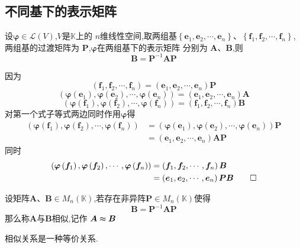 \subsection{不同基下的表示矩阵}
\begin{formal}
\begin{theorem}[不同基下的表示矩阵]\label{thm:不同基下的表示矩阵}
    设$\bm{\varphi}\in \mathcal{L}\left(
        V
    \right)$,$V$是$\mathbb{K}$上的
    $n$维线性空间,取两组基$\left\{
        \bm{e}_1,\bm{e}_2,\cdots,\bm{e}_n
    \right\}$、$
    \left\{
        \bm{f}_1,\bm{f}_2,\cdots,\bm{f}_n
    \right\}$,
    两组基的过渡矩阵为
    $\bm{P}$,$\bm{\varphi}$在两组基下的表示矩阵
    分别为
    $\bm{A}$、$\bm{B}$,则
    \[
    \bm{B}=\bm{P}^{-1}\bm{AP}
    \]
\end{theorem}
\begin{Proof}
因为
\[
\left(\bm{f}_1,\bm{f}_2,\cdots,\bm{f}_n\right)
=\left(\bm{e}_1,\bm{e}_2,\cdots,\bm{e}_n\right)
\bm{P}
\]
\[
\left(
    \bm{\varphi}\left(\bm{e}_1\right),
    \bm{\varphi}\left(\bm{e}_2\right),\cdots,
    \bm{\varphi}\left(\bm{e}_n\right)
\right)=
\left(\bm{e}_1,\bm{e}_2,\cdots,\bm{e}_n\right)\bm{A}
\]
\[
\left(
    \bm{\varphi}\left(\bm{f}_1\right),
    \bm{\varphi}\left(\bm{f}_2\right),\cdots,
    \bm{\varphi}\left(\bm{f}_n\right)
\right)=
\left(\bm{f}_1,\bm{f}_2,\cdots,\bm{f}_n\right)\bm{B}
\]
对第一个式子等式两边同时作用$\bm{\varphi}$得
\begin{align*}
   \left(
    \bm{\varphi}\left(\bm{f}_1\right),
    \bm{\varphi}\left(\bm{f}_2\right),\cdots,
    \bm{\varphi}\left(\bm{f}_n\right)
\right)&=
\left(\bm{\varphi}\left(\bm{e}_1\right)
,\bm{\varphi}\left(\bm{e}_2\right)
,\cdots,\bm{\varphi}\left(\bm{e}_n\right)
\right)\bm{P} \\
&=\left(\bm{e}_1,\bm{e}_2,\cdots,\bm{e}_n\right)
\bm{AP}
\end{align*}
同时
\begin{align*}
    \left(
    \bm{\varphi}\left(\bm{f}_1\right),
    \bm{\varphi}\left(\bm{f}_2\right),\cdots,
    \bm{\varphi}\left(\bm{f}_n\right)
\right)&=\left(\bm{f}_1,\bm{f}_2,\cdots,\bm{f}_n\right)
\bm{B}\\
&=\left(\bm{e}_1,\bm{e}_2,\cdots,\bm{e}_n\right)
\bm{PB}\qedhere
\end{align*}
\end{Proof}
\end{formal}
\begin{formal}
\begin{definition}[相似]\label{def:相似}
    设矩阵$\bm{A}$、$\bm{B}\in M_n\left(
        \mathbb{K}
    \right)$,若存在非异阵$\bm{P}\in M_n\left(
        \mathbb{K}
    \right)$使得
    \[
    \bm{B}=\bm{P}^{-1}\bm{AP}
    \]
    那么称$\bm{A}$与$\bm{B}$相似,记作
    $\bm{A}\thickapprox \bm{B}$
\end{definition}
\end{formal}
\begin{formal}
\begin{theorem}[相似关系]\label{thm:相似关系}
    相似关系是一种等价关系.
\end{theorem}
\end{formal}
\newpage
